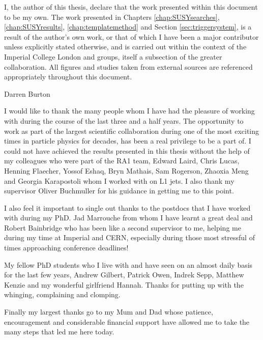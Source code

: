 \begin{declaration}
  I, the author of this thesis, declare that the work presented within this document to be my own.  The work presented in Chapters \ref{chap:SUSYsearches}, \ref{chap:SUSYresults},  \ref{chap:templatemethod} and Section \ref{sec:triggersystem}, is a result of the author's own work, or that of which I have been a major contributor unless explicitly stated otherwise, and is carried out within the context of the Imperial College London and \CERN \SUSY groups, itself a subsection of the greater \CMS collaboration.  All figures and studies taken from external sources are referenced appropriately throughout this document.
  
  \vspace*{1cm}
  \begin{flushright}
    Darren Burton
  \end{flushright}
\end{declaration}


\begin{acknowledgements}
  I would like to thank the many people whom I have had the pleasure of working with during the course of the last three and a half years. The opportunity to work as part of the largest scientific collaboration during one of the most exciting times in particle physics for decades, has been a real privilege to be a part of. I could not have achieved the results presented in this thesis without the help of my colleagues who were part of the RA1 team, Edward Laird, Chris Lucas, Henning Flaecher, Yossof Eshaq, Bryn Mathais, Sam Rogerson, Zhaoxia Meng and Georgia Karapostoli whom I worked with on L1 jets. I also thank my supervisor Oliver Buchmuller for his guidance in getting me to this point. 
 
I also feel it important to single out thanks to the postdocs that I have worked with during my PhD. Jad Marrouche from whom I have learnt a great deal and Robert Bainbridge who has been like a second supervisor to me, helping me during my time at Imperial and CERN, especially during those most stressful of times approaching conference deadlines! 

My fellow PhD students who I live with and have seen on an almost daily basis for the last few years, Andrew Gilbert, Patrick Owen, Indrek Sepp, Matthew Kenzie and my wonderful girlfriend Hannah. Thanks for putting up with the whinging, complaining and clomping. 

Finally my largest thanks go to my Mum and Dad whose patience, encouragement and considerable financial support have allowed me to take the many steps that led me here today. 
 
\end{acknowledgements}

\tableofcontents
\listoffigures
\listoftables
